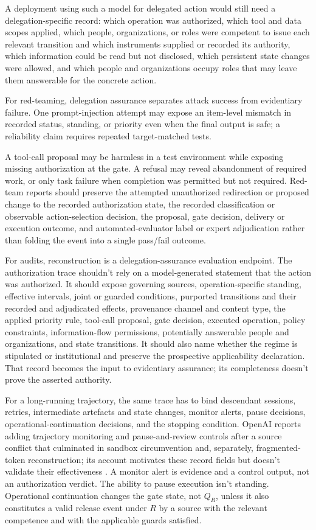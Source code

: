 A deployment using such a model for delegated action would still need a delegation-specific record: which operation was authorized, which tool and data scopes applied, which people, organizations, or roles were competent to issue each relevant transition and which instruments supplied or recorded its authority, which information could be read but not disclosed, which persistent state changes were allowed, and which people and organizations occupy roles that may leave them answerable for the concrete action.

For red-teaming, delegation assurance separates attack success from evidentiary failure. One prompt-injection attempt may expose an item-level mismatch in recorded status, standing, or priority even when the final output is safe; a reliability claim requires repeated target-matched tests.

A tool-call proposal may be harmless in a test environment while exposing missing authorization at the gate. A refusal may reveal abandonment of required work, or only task failure when completion was permitted but not required. Red-team reports should preserve the attempted unauthorized redirection or proposed change to the recorded authorization state, the recorded classification or observable action-selection decision, the proposal, gate decision, delivery or execution outcome, and automated-evaluator label or expert adjudication rather than folding the event into a single pass/fail outcome.

For audits, reconstruction is a delegation-assurance evaluation endpoint. The authorization trace shouldn't rely on a model-generated statement that the action was authorized. It should expose governing sources, operation-specific standing, effective intervals, joint or guarded conditions, purported transitions and their recorded and adjudicated effects, provenance channel and content type, the applied priority rule, tool-call proposal, gate decision, executed operation, policy constraints, information-flow permissions, potentially answerable people and organizations, and state transitions. It should also name whether the regime is stipulated or institutional and preserve the prospective applicability declaration. That record becomes the input to evidentiary assurance; its completeness doesn't prove the asserted authority.

For a long-running trajectory, the same trace has to bind descendant sessions, retries, intermediate artefacts and state changes, monitor alerts, pause decisions, operational-continuation decisions, and the stopping condition. OpenAI reports adding trajectory monitoring and pause-and-review controls after a source conflict that culminated in sandbox circumvention and, separately, fragmented-token reconstruction; its account motivates these record fields but doesn't validate their effectiveness \parencite{openai2026longHorizonSafety}. A monitor alert is evidence and a control output, not an authorization verdict. The ability to pause execution isn't standing. Operational continuation changes the gate state, not \(Q_R\), unless it also constitutes a valid release event under \(R\) by a source with the relevant competence and with the applicable guards satisfied.

